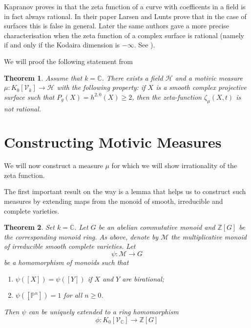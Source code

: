\documentclass[11pt, a4paper, german]{article}
\theoremstyle{plain}
\newtheorem{theorem}{Theorem}
\theoremstyle{definition}
\newcommand{\gring}[1][k]{K_0[\mathcal{V}_#1]}
\begin{document}
Kapranov proves in \cite{kapranov} that the zeta function of a curve with coefficents in a field is in fact always rational. 
In their paper \cite{MR1996804} Larsen and Lunts prove that in the case of surfaces this is false in general.
Later the same authors gave a more precise characterisation when the zeta function of a complex surface is rational 
(namely if and only if the Kodaira dimension is $-\infty$. See \cite{LL2}).

We will proof the following statement from \cite{MR1996804}
\begin{theorem}
    Assume that $k = \mathbb{C}$. There exists a field $\mathcal{H}$ and a motivic measure $\mu \colon \gring \to \mathcal{H}$ with the following
    property: if $X$ is a smooth complex projective surface such that $P_g(X)=h^{2,0}(X) \ge 2$, then the zeta-function $\zeta_{\mu}(X,t)$
    is not rational.
\end{theorem}

\section{Constructing Motivic Measures}

We will now construct a measure $\mu$ for which we will show irrationality of the zeta function.

The first important result on the way is a lemma that helps us to construct such measures by extending maps from the monoid of smooth, irreducible
and complete varieties.

\begin{theorem}
    \label{th1}
    Set $k = \mathbb{C}$. Let $G$ be an abelian commutative monoid and $\mathbb{Z}[G]$ be the corresponding monoid ring. As above, denote
    by $\mathcal{M}$ the multiplicative monoid of irreducible smooth complete varieties. Let
    \[
        \psi: \mathcal{M} \to G
    \]
    be a homomorphism of monoids such that
    \begin{enumerate}
        \item $\psi([X]) = \psi([Y])$ if $X$ and $Y$ are birational;
        \item $\psi([\mathbb{P}^n]) = 1$ for all $n \ge 0$.
    \end{enumerate}
    Then $\psi$ can be uniquely extended to a ring homomorphism 
    \[
        \phi: \gring[\mathbb{C}] \to \mathbb{Z} [G]
    \]
\end{theorem}
\end{document}
